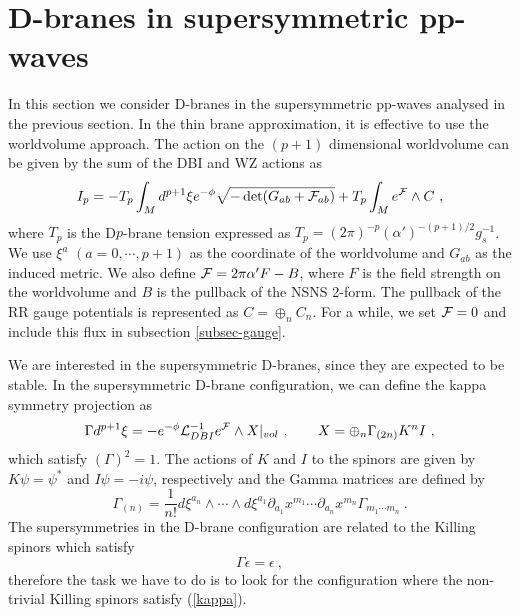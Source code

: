 \documentclass[a4paper,12pt]{article}
\numberwithin{equation}{section}
\newcommand{\del}{\partial}
\begin{document}

\section{D-branes in supersymmetric pp-waves}
\label{section-D-branes}

In this section we consider D-branes in the supersymmetric pp-waves
analysed in the previous section.
In the thin brane approximation, it is effective to use the worldvolume
approach.
The action on the $(p+1)$ dimensional worldvolume can be given by the sum of
the DBI and WZ actions as
\begin{equation}
 I_p = - T_{p} \int _M d^{p+1} \xi
  e^{-\phi} \sqrt{-\det(G_{ab} + {\cal F}_{ab})} 
       + T_{p} \int _M e^{\cal F} \wedge C ~, 
\end{equation}
where $T_{p}$ is the D$p$-brane tension expressed as 
$T_{p}=(2\pi)^{-p}(\alpha')^{-(p+1)/2}g_s^{-1}$.
We use $\xi^a$ $(a=0,\cdots,p+1)$ as the coordinate of the worldvolume and
$G_{ab}$ as the induced metric. We also define
${\cal F} = 2\pi \alpha' F-B$, where
$F$ is the field strength on the worldvolume and $B$ is the pullback of
the NSNS 2-form. The pullback of the RR gauge potentials is represented
as $C = \oplus_n C_n$.
For a while, we set ${\cal F} = 0$ and include this flux in subsection 
\ref{subsec-gauge}.

We are interested in the supersymmetric D-branes, since they are
expected to be stable.
In the supersymmetric D-brane configuration, we can define the kappa
symmetry projection as
 \cite{Cederwall:1997pv,Aganagic:1997pe,Cederwall:1997ri,Bergshoeff:1997tu,%
                   Aganagic:1997nn,Bergshoeff:1997kr} 
\begin{equation}
 \Gamma d^{p+1} \xi 
   = - e^{-\phi} {\cal L}^{-1}_{DBI}  e^{\cal F} \wedge X|_{vol}~,\qquad
 X = \oplus_n \Gamma_{(2n)} K^n I ~,
\label{projection}
\end{equation}
which satisfy $(\Gamma)^2 =1$.
The actions of $K$ and $I$ to the spinors are given by $K \psi = \psi^*$ and
$I \psi = -i \psi $, respectively and the Gamma matrices are defined by
\begin{equation}
 \Gamma_{(n)} = \frac{1}{n!} d \xi^{a_n} \wedge \cdots \wedge d\xi^{a_1} 
   \del_{a_1} x^{m_1} \cdots \del_{a_n} x^{m_n} \Gamma_{m_1 \cdots m_n} ~.
\end{equation}
The supersymmetries in the D-brane configuration are related to the
Killing spinors which satisfy
\begin{equation}
 \Gamma \epsilon = \epsilon ~,
\label{kappa}
\end{equation}
therefore the task we have to do is to look for the configuration
where the non-trivial Killing spinors satisfy (\ref{kappa}).
\end{document}
